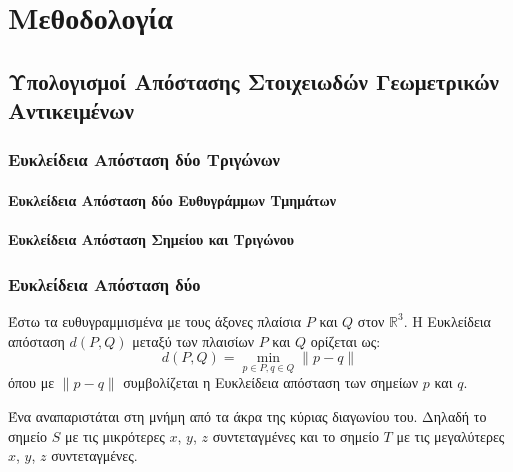 \chapter{Μεθοδολογία}
\label{ch:methodology}

\section{Υπολογισμοί Απόστασης Στοιχειωδών Γεωμετρικών Αντικειμένων}
\subsection{Ευκλείδεια Απόσταση δύο Τριγώνων}
\label{subsec:tria_distance}


\subsubsection{Ευκλείδεια Απόσταση δύο Ευθυγράμμων Τμημάτων}
\subsubsection{Ευκλείδεια Απόσταση Σημείου και Τριγώνου}
\subsection{Ευκλείδεια Απόσταση δύο }
Έστω τα ευθυγραμμισμένα με τους άξονες πλαίσια
$P$ και $Q$ στον $\mathbb{R}^3$.
Η Ευκλείδεια απόσταση $d(P,Q)$ μεταξύ των πλαισίων $P$ και $Q$
ορίζεται ως:
\[ d(P,Q) = \min_{p \in P, q \in Q} \lVert p - q \rVert \]
όπου με $\lVert p - q \rVert$ συμβολίζεται η Ευκλείδεια 
απόσταση των σημείων $p$ και $q$.

Ένα  αναπαριστάται στη μνήμη από τα άκρα της κύριας 
διαγωνίου του.
Δηλαδή το σημείο $S$ με τις μικρότερες $x$, $y$, $z$ συντεταγμένες
και το σημείο $T$ με τις μεγαλύτερες $x$, $y$, $z$ συντεταγμένες.

